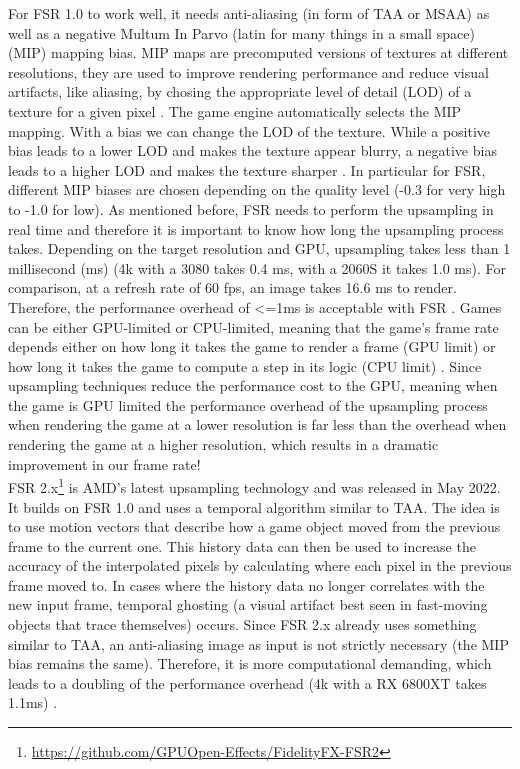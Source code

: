 \documentclass[letterpaper, 10 pt, conference]{ieeeconf}  %
\begin{document}
For FSR 1.0 to work well, it needs anti-aliasing (in form of TAA or MSAA) as well as a negative Multum In Parvo (latin for many things in a small space) (MIP) mapping bias.
MIP maps are precomputed versions of textures at different resolutions, they are used to improve rendering performance and reduce visual artifacts, like aliasing, by chosing the appropriate level of detail (LOD) of a texture for a given pixel \cite{MIP_map}.
The game engine automatically selects the MIP mapping. With a bias we can change the LOD of the texture. While a positive bias leads to a lower LOD and makes the texture appear blurry, a negative bias leads to a higher LOD and makes the texture sharper \cite{MIP_mapBias}.
In particular for FSR, different MIP biases are chosen depending on the quality level (-0.3 for very high to -1.0 for low).
As mentioned before, FSR needs to perform the upsampling in real time and therefore it is important to know how long the upsampling process takes.
Depending on the target resolution and GPU, upsampling takes less than 1 millisecond (ms) (4k with a 3080 takes 0.4 ms, with a 2060S it takes 1.0 ms).
For comparison, at a refresh rate of 60 fps, an image takes 16.6 ms to render. Therefore, the performance overhead of <=1ms is acceptable with FSR \cite{fsr1.0}.
Games can be either GPU-limited or CPU-limited, meaning that the game's frame rate depends either on how long it takes the game to render a frame (GPU limit) or how long it takes the game to compute a step in its logic (CPU limit) \cite{gpu-cpu-limit}.
Since upsampling techniques reduce the performance cost to the GPU, meaning when the game is GPU limited the performance overhead of the upsampling process when rendering the game at a lower resolution is far less than the overhead when rendering the game at a higher resolution, which results in a dramatic improvement in our frame rate!\\
FSR 2.x\footnote{\url{https://github.com/GPUOpen-Effects/FidelityFX-FSR2}} is AMD's latest upsampling technology and was released in May 2022.
It builds on FSR 1.0 and uses a temporal algorithm similar to TAA. The idea is to use motion vectors that describe how a game object moved from the previous frame to the current one.
This history data can then be used to increase the accuracy of the interpolated pixels by calculating where each pixel in the previous frame moved to.
In cases where the history data no longer correlates with the new input frame, temporal ghosting (a visual artifact best seen in fast-moving objects that trace themselves) occurs. 
Since FSR 2.x already uses something similar to TAA, an anti-aliasing image as input is not strictly necessary (the MIP bias remains the same).
Therefore, it is more computational demanding, which leads to a doubling of the performance overhead (4k with a RX 6800XT takes 1.1ms) \cite{fsr2.x}.
\end{document}
